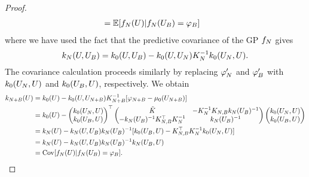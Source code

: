 \documentclass[12pt]{article}
\begin{document}
\begin{proof}
\begin{align*}
&= \E[\funcEm[\Ndesign](\parMat) | \funcEm[\Ndesign](\designIn[\Nbatch]) = \funcVal[\Nbatch]] 
\end{align*}
where we have used the fact that the predictive covariance of the GP $\funcEm[\Ndesign]$ gives 
\[
\gpKer[\Ndesign](\parMat, \designIn[\Nbatch]) = \gpKerPrior(\parMat, \designIn[\Nbatch]) - 
\gpKerPrior(\parMat, \designIn[\Ndesign])\kerMat[\Ndesign]^{-1} \gpKerPrior(\designIn[\Ndesign], \parMat).
\]
The covariance calculation proceeds similarly by replacing $\funcVal[\Ndesign]^\prime$ and $\funcVal[\Nbatch]^\prime$ with 
$\gpKerPrior(\designIn[\Ndesign], \parMat)$ and $\gpKerPrior(\designIn[\Nbatch], \parMat)$, respectively. We obtain 
\begin{align*}
\gpKer[\Naugment](\parMat)
&= \gpKerPrior(\parMat) - \gpKerPrior(\parMat, \designIn[\Naugment]) \kerMat[\Naugment]^{-1}[\funcVal[\Naugment] - \gpMeanPrior(\designIn[\Naugment])] \\
&= \gpKerPrior(\parMat) - \begin{pmatrix} \gpKerPrior(\designIn[\Ndesign], \parMat) \\  \gpKerPrior(\designIn[\Nbatch], \parMat) \end{pmatrix}^\top
\begin{pmatrix} \tilde{K} & -\kerMat[\Ndesign]^{-1} \kerMat[\Ndesign,\Nbatch] \gpKer[\Ndesign](\designBatchIn)^{-1} \\
-\gpKer[\Ndesign](\designBatchIn)^{-1} \kerMat[\Ndesign,\Nbatch]^\top  \kerMat[\Ndesign]^{-1} & \gpKer[\Ndesign](\designBatchIn)^{-1} \end{pmatrix} 
\begin{pmatrix}  \gpKerPrior(\designIn[\Ndesign], \parMat) \\  \gpKerPrior(\designIn[\Nbatch], \parMat) \end{pmatrix} \\
&= \gpKer[\Ndesign](\parMat) - 
\gpKer[\Ndesign](\parMat, \designIn[\Nbatch]) \gpKer[\Ndesign](\designIn[\Nbatch])^{-1} [\gpKerPrior(\designIn[\Nbatch], \parMat) - \kerMat[\Ndesign,\Nbatch]^\top \kerMat[\Ndesign]^{-1}\gpKerPrior(\designIn[\Ndesign], \parMat)] \\
&= \gpKer[\Ndesign](\parMat) -  \gpKer[\Ndesign](\parMat, \designIn[\Nbatch]) \gpKer[\Ndesign](\designIn[\Nbatch])^{-1} \gpKer[\Ndesign](\designIn[\Nbatch], \parMat) \\
&= \Cov[\funcEm[\Ndesign](\parMat) | \funcEm[\Ndesign](\designIn[\Nbatch]) = \funcVal[\Nbatch]].
\end{align*}

\end{proof}
\end{document}

